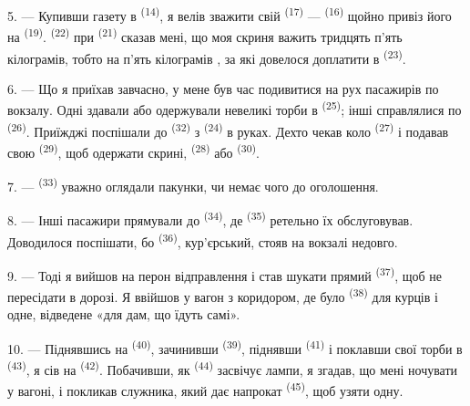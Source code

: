 \VUsaut{3.0mm}

5. --- Купивши газету в  \textsuperscript{(14)}, я велів зважити
свій  \textsuperscript{(17)} --- 
\textsuperscript{(16)} щойно привіз його на 
\textsuperscript{(19)}.  \textsuperscript{(22)} при
 \textsuperscript{(21)} сказав мені, що моя скриня важить тридцять
п'ять кілограмів, тобто на п'ять кілограмів , за які
довелося доплатити в  \textsuperscript{(23)}.

6. --- Що я приїхав завчасно, у мене був час подивитися на рух пасажирів по
вокзалу. Одні здавали або одержували невеликі торби в 
\textsuperscript{(25)}; інші справлялися по 
\textsuperscript{(26)}. Приїжджі поспішали до 
\textsuperscript{(32)} з  \textsuperscript{(24)} в руках. Дехто
чекав коло  \textsuperscript{(27)} і подавав свою
 \textsuperscript{(29)}, щоб одержати скрині, 
\textsuperscript{(28)} або  \textsuperscript{(30)}.

7. ---  \textsuperscript{(33)} уважно оглядали пакунки,
чи немає чого до оголошення.

8. --- Інші пасажири прямували до  \textsuperscript{(34)}, де
 \textsuperscript{(35)} ретельно їх обслуговував. Доводилося
поспішати, бо  \textsuperscript{(36)}, кур'єрський, стояв на
вокзалі недовго.

9. --- Тоді я вийшов на перон відправлення і став шукати прямий 
\textsuperscript{(37)}, щоб не пересідати в дорозі. Я ввійшов у вагон з
коридором, де було  \textsuperscript{(38)} для курців і одне,
відведене «для дам, що їдуть самі».

\VUsaut{3.0mm}

10. --- Піднявшись на  \textsuperscript{(40)}, зачинивши
 \textsuperscript{(39)}, піднявши 
\textsuperscript{(41)} і поклавши свої торби в 
\textsuperscript{(43)}, я сів на  \textsuperscript{(42)}.
Побачивши, як  \textsuperscript{(44)} засвічує лампи, я
згадав, що мені ночувати у вагоні, і покликав служника, який дає напрокат
 \textsuperscript{(45)}, щоб узяти одну.

